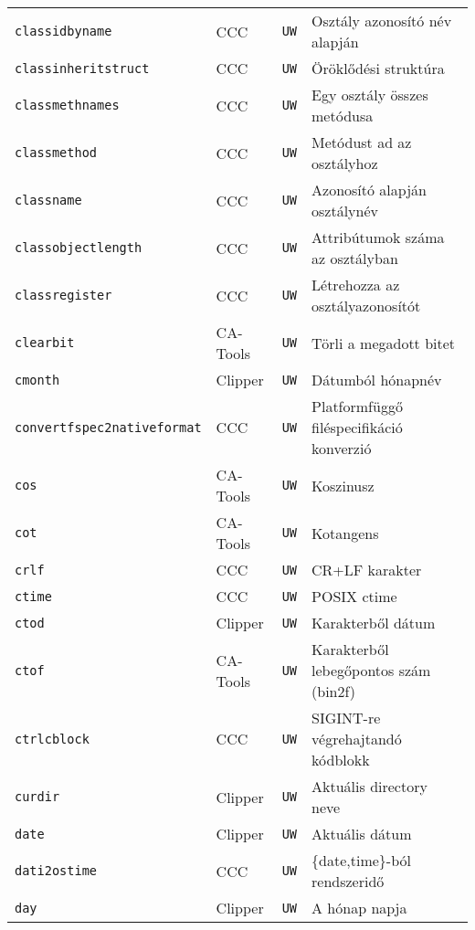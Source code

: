 \begin{tabular}{|l|l|l|l|}
\verb!classidbyname!               & CCC      &  {\tt UW} & Osztály azonosító név alapján\\
\verb!classinheritstruct!          & CCC      &  {\tt UW} & Öröklődési struktúra\\
\verb!classmethnames!              & CCC      &  {\tt UW} & Egy osztály összes metódusa\\
\verb!classmethod!                 & CCC      &  {\tt UW} & Metódust ad az osztályhoz\\
\verb!classname!                   & CCC      &  {\tt UW} & Azonosító alapján osztálynév\\
\verb!classobjectlength!           & CCC      &  {\tt UW} & Attribútumok száma az osztályban\\
\verb!classregister!               & CCC      &  {\tt UW} & Létrehozza az osztályazonosítót\\
\verb!clearbit!                    & CA-Tools &  {\tt UW} & Törli a megadott bitet\\
\verb!cmonth!                      & Clipper  &  {\tt UW} & Dátumból hónapnév\\
\verb!convertfspec2nativeformat!   & CCC      &  {\tt UW} & Platformfüggő filéspecifikáció konverzió\\
\verb!cos!                         & CA-Tools &  {\tt UW} & Koszinusz\\
\verb!cot!                         & CA-Tools &  {\tt UW} & Kotangens\\
\verb!crlf!                        & CCC      &  {\tt UW} & CR+LF karakter\\
\verb!ctime!                       & CCC      &  {\tt UW} & POSIX ctime\\
\verb!ctod!                        & Clipper  &  {\tt UW} & Karakterből dátum\\
\verb!ctof!                        & CA-Tools &  {\tt UW} & Karakterből lebegőpontos szám (bin2f)\\
\verb!ctrlcblock!                  & CCC      &  {\tt UW} & SIGINT-re végrehajtandó kódblokk\\
\verb!curdir!                      & Clipper  &  {\tt UW} & Aktuális directory neve\\
\verb!date!                        & Clipper  &  {\tt UW} & Aktuális dátum\\
\verb!dati2ostime!                 & CCC      &  {\tt UW} & \{date,time\}-ból rendszeridő\\
\verb!day!                         & Clipper  &  {\tt UW} & A hónap napja\\

\end{tabular}
